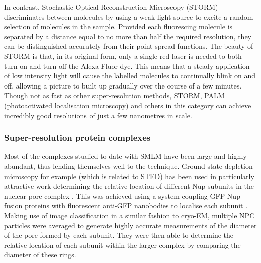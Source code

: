 \documentclass[a4paper,11pt,twoside,openright]{scrbook}
\begin{document}
In contrast, Stochastic Optical Reconstruction Microscopy \cite{Rust2006} (STORM) discriminates between molecules by using a weak light source to excite a random selection of molecules in the sample. Provided each fluorescing molecule is separated by a distance equal to no more than half the required resolution, they can be distinguished accurately from their point spread functions. The beauty of STORM is that, in its original form, only a single red laser is needed to both turn on and turn off the Alexa Fluor dye. This means that a steady application of low intensity light will cause the labelled molecules to continually blink on and off, allowing a picture to built up gradually over the course of a few minutes. Though not as fast as other super-resolution methods, STORM, PALM (photoactivated localisation microscopy) and others in this category can achieve incredibly good resolutions of just a few nanometres in scale.

\subsubsection{Super-resolution protein complexes}
Most of the complexes studied to date with SMLM have been large and highly abundant, thus lending themselves well to the technique. Ground state depletion microscopy for example (which is related to STED) has been used in particularly attractive work determining the relative location of different Nup subunits in the nuclear pore complex \cite{Szymborska2013}. This was achieved using a system coupling GFP-Nup fusion proteins with fluorescent anti-GFP nanobodies to localise each subunit \cite{Ries2012}. Making use of image classification in a similar fashion to cryo-EM, multiple NPC particles were averaged to generate highly accurate measurements of the diameter of the pore formed by each subunit. They were then able to determine the relative location of each subunit within the larger complex by comparing the diameter of these rings.
\end{document}
